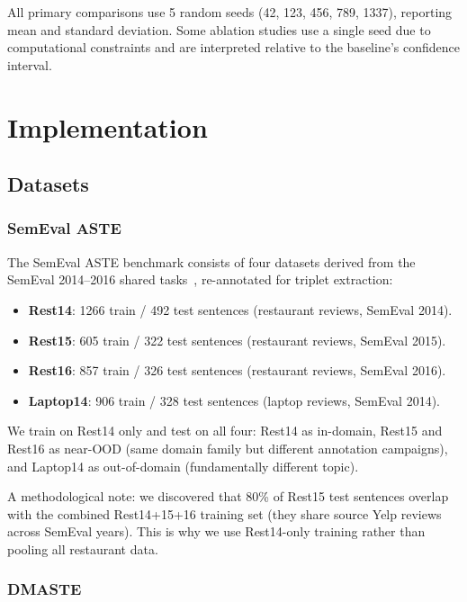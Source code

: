 \documentclass[12pt,a4paper]{report}
\begin{document}
All primary comparisons use 5 random seeds (42, 123, 456, 789, 1337), reporting mean and standard deviation. Some ablation studies use a single seed due to computational constraints and are interpreted relative to the baseline's confidence interval.



\chapter{Implementation}\label{ch:implementation}

\section{Datasets}\label{sec:datasets}

\subsection{SemEval ASTE}

The SemEval ASTE benchmark consists of four datasets derived from the SemEval 2014--2016 shared tasks~\cite{pontiki2014semeval, pontiki2015semeval, pontiki2016semeval}, re-annotated for triplet extraction:

\begin{itemize}
    \item \textbf{Rest14}: 1266 train / 492 test sentences (restaurant reviews, SemEval 2014).
    \item \textbf{Rest15}: 605 train / 322 test sentences (restaurant reviews, SemEval 2015).
    \item \textbf{Rest16}: 857 train / 326 test sentences (restaurant reviews, SemEval 2016).
    \item \textbf{Laptop14}: 906 train / 328 test sentences (laptop reviews, SemEval 2014).
\end{itemize}

We train on Rest14 only and test on all four: Rest14 as in-domain, Rest15 and Rest16 as near-OOD (same domain family but different annotation campaigns), and Laptop14 as out-of-domain (fundamentally different topic).

A methodological note: we discovered that 80\% of Rest15 test sentences overlap with the combined Rest14+15+16 training set (they share source Yelp reviews across SemEval years). This is why we use Rest14-only training rather than pooling all restaurant data.

\subsection{DMASTE}
\end{document}
